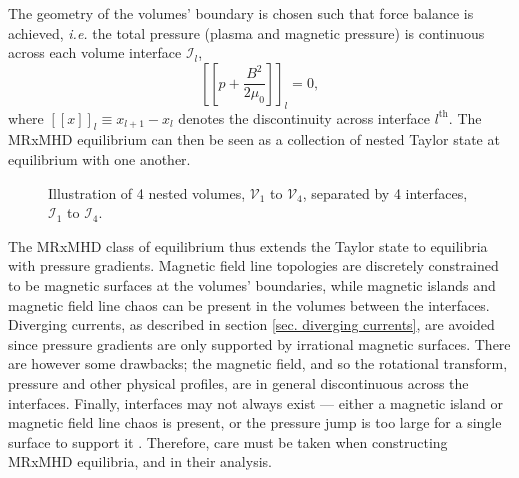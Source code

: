 \documentclass[my_thesis.tex]{subfiles}
\begin{document}
The geometry of the volumes' boundary is chosen such that force balance is achieved, \textit{i.e.} the total pressure (plasma and magnetic pressure) is continuous across each volume interface $\mathcal{I}_l$,
\begin{equation}
	\left[\left[p + \frac{B^2}{2\mu_0}\right]\right]_l = 0, \label{eq.force_balance}
\end{equation}
where $[[x]]_l\equiv x_{l+1}-x_l$ denotes the discontinuity across interface $l^{\text{th}}$. The MRxMHD equilibrium can then be seen as a collection of nested Taylor state at equilibrium with one another. 

\begin{figure}
	\centering
	\caption{Illustration of 4 nested volumes, $\mathcal{V}_1$ to $\mathcal{V}_4$, separated by 4 interfaces, $\mathcal{I}_1$ to $\mathcal{I}_4$.}
	\label{fig:Illustration_SPEC}
\end{figure}

The MRxMHD class of equilibrium thus extends the Taylor state to equilibria with pressure gradients. Magnetic field line topologies are discretely constrained to be magnetic surfaces at the volumes' boundaries, while magnetic islands and magnetic field line chaos can be present in the volumes between the interfaces. Diverging currents, as described in section \ref{sec. diverging currents}, are avoided since pressure gradients are only supported by irrational magnetic surfaces. There are however some drawbacks; the magnetic field, and so the rotational transform, pressure and other physical profiles, are in general discontinuous across the interfaces. Finally, interfaces may not always exist --- either a magnetic island or magnetic field line chaos is present, or the pressure jump is too large for a single surface to support it \citep{Qu2021}. Therefore, care must be taken when constructing MRxMHD equilibria, and in their analysis. 
\end{document}
